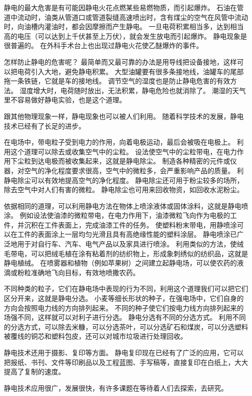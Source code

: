 静电的最大危害是有可能因静电火花点燃某些易燃物质，而引起爆炸。
石油在管道中流动时，油类从管道口或管道裂缝高速喷出时，含有煤尘的空气在风管中流动时，向油槽内灌油时，都会因摩擦而产生静电。
一旦电荷积累相当多，达到相当高的电压（可以达到上千伏甚至上万伏），就会发生放电而引起爆炸。
静电现象是很普遍的。
在外科手术台上也出现过静电火花使乙醚爆炸的事件。

怎样防止静电的危害呢？
最简单而又最可靠的办法是用导线把设备接地，这样可以把电荷引入大地，避免静电积累。
大型油罐要有很多条接地线，油罐车的尾部拖一条铁链，它就是车的接地线。
调节空气的湿度也是防止静电危害的有效方法。
湿度增大时，电荷随时放出，无法积累，静电危险也就消除了。
潮湿的天气里不容易做好静电实验，也是这个道理。

跟其他物理现象一样，静电现象也可以被人们利用。
随着科学技术的发展，静电技术已经有了长足的进步。

在电场中，带电粒子受到电力的作用，向着电极运动，最后会被吸在电极上。
利用这个道理可以除去或收集空气中的尘粒。
设法使空气中的尘粒带电，在电力作用下尘粒到达电极而被收集起来，这就是静电除尘。
制造各种精密的元件或仪器，对空气的净化程度要求很高，空气中的微粒多，会严重影响产品的质量。
利静电除尘可以有效地提高空气的净化程度。
静电除尘还可用于粉尘较多的场所，除去空气中对人们有害的微粒。
静电除尘也可用来回收物资，如回收水泥粉尘。

依据相同的道理，可以利用静电方法在物体上喷涂液体或固体涂料，这就是静电喷涂。
例如设法使油漆的微粒带电，在电力作用下，油漆微粒飞向作为电极的工件，并沉积在工件表面上，完成油漆工件的任务。
使塑料粉末带电，用静喷涂可以在工件的表面涂上一层均匀光滑且具有高绝缘性能的塑料涂层。
静电喷涂已广泛地用于对自行车、汽车、电气产品以及家具进行喷涂。
利用类似的方法，使绒毛带电，可以把绒毛植在涂有粘着剂的纺织物上，形成象刺绣似的纺织品，这就是静电植绒。
在喷雾器和植物（例如苹果树）之间建立起静电场，可以使农药的液滴或粉粒准确地飞向目标，有效地喷撒农药。

不同种类的粒子，它们在静电场中表现的行为不同，利用这个道理我们可以把它们区分开来，这就是静电分选。
小麦等细长形状的种子，在强电场中，它们自身的方向会按照电力线的方向排列起来。
不同的种子使它们按电力线方向排列起来的场强不同，这样就可以对利子进行分选。
静电分选有不同的分选方式。
利用不同的分选方式，可以除去米糠，可以分选茶叶，可以分选矿石和煤炭，可以分选塑料被覆线的铜芯和塑料包皮，还可以对城市垃圾进行处理回收。

静电技术还用于摄影、复印等方面。
静电复印现在已经有了广泛的应用，它可以把报纸、书刊、文件等印刷品以及工程蓝图、手写稿等，直接复印在白纸上，大大提高了复制的速度。

静电技术应用很广，发展很快，有许多课题在等待着人们去探索，去研究。

